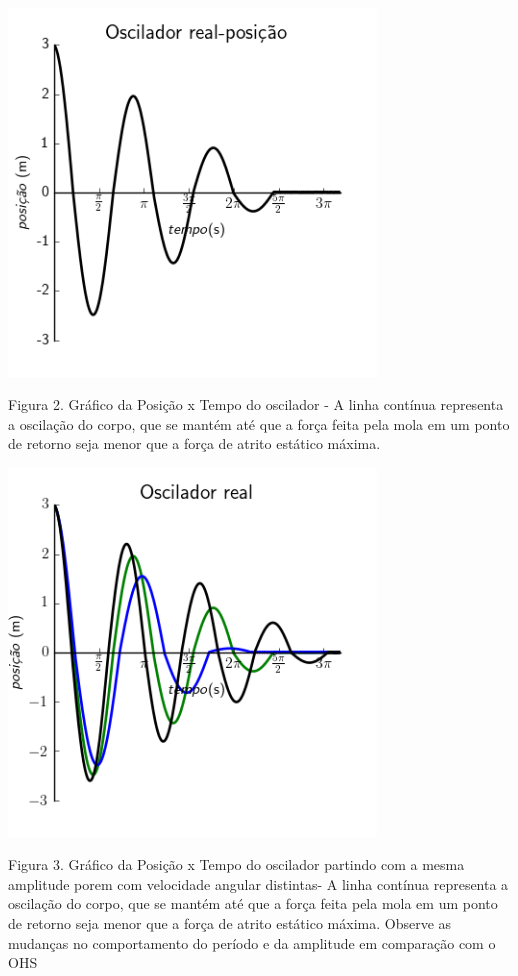 \documentclass[a4paper]{article} %
\begin{document}
\begin{center}
	\includegraphics[width=3.84in,height=3.84in,keepaspectratio = false]{image1_1.png}
	
	\scriptsize Figura 2. Gr\'afico da Posi\c{c}\~ao x Tempo do oscilador - A linha cont\'inua representa a oscila\c{c}\~ao do corpo, que se mant\'em at\'e que a for\c{c}a feita pela mola em um ponto de retorno seja menor que a for\c{c}a de atrito est\'atico m\'axima.
	
\end{center}

\begin{center}
	\includegraphics[width=3.84in,height=3.84in,keepaspectratio = false]{image_c1.png}
	
	\scriptsize Figura 3. Gr\'afico da Posi\c{c}\~ao x Tempo do oscilador partindo com a mesma amplitude porem com velocidade angular distintas- A linha cont\'inua representa a oscila\c{c}\~ao do corpo, que se mant\'em at\'e que a for\c{c}a feita pela mola em um ponto de retorno seja menor que a for\c{c}a de atrito est\'atico m\'axima. Observe as mudan\c{c}as no comportamento do per\'iodo e da amplitude em compara\c{c}\~ao com o OHS
	
\end{center}
\end{document}
